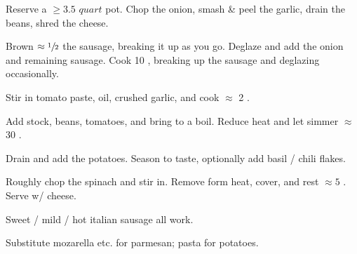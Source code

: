 \begin{preparation}
\item Reserve a $\ge 3.5$ $quart$ pot.
    Chop the onion, smash \& peel the garlic, drain the beans, shred the cheese.

\item Brown $\approx \sfrac{1}{2}$ the sausage, breaking it up as you go.
    Deglaze and add the onion and remaining sausage.
    Cook 10 \minute, breaking up the sausage and deglazing occasionally.

\item Stir in tomato paste, oil, crushed garlic, and cook $\approx$ 2 \minute.

\item Add stock, beans, tomatoes, and bring to a boil.
    Reduce heat and let simmer $\approx$ 30 \minute.

\item Drain and add the potatoes.
    Season to taste, optionally add basil / chili flakes.

\item Roughly chop the spinach and stir in.
    Remove form heat, cover, and rest $\approx 5$ \minute.
    Serve w/ cheese.
\end{preparation}

\begin{variation}
\item Sweet / mild / hot italian sausage all work.

\item Substitute mozarella etc. for parmesan; pasta for potatoes.
\end{variation}

\recipeend
